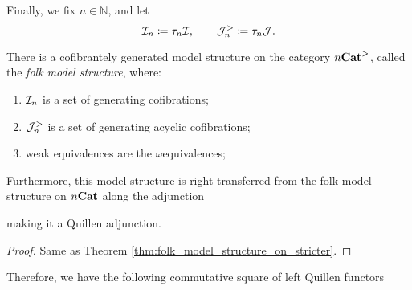 \noindent Finally, we fix \( n \in \mathbb{N} \), and let
\begin{equation*}
    \mathcal{I}_n \coloneqq \tau_{n}\mathcal{I},\quad\quad \mathcal{J}^>_n \coloneqq \tau_{n}\mathcal{J}.
\end{equation*}

\begin{thm} \label{thm:folk_model_structure_on_stricter_n}
    There is a cofibrantely generated model structure on the category \( {n\mathbf{Cat}}^> \), called the \emph{folk model structure}, where:
    \begin{enumerate}
        \item \( \mathcal{I}_n \) is a set of generating cofibrations;
        \item \( \mathcal{J}^>_n \) is a set of generating acyclic cofibrations;
        \item weak equivalences are the \( \omega \)\nbd equivalences;
    \end{enumerate}
    Furthermore, this model structure is right transferred from the folk model structure on \( {n\mathbf{Cat}} \) along the adjunction 
    \begin{center}
    \end{center}
    making it a Quillen adjunction.
\end{thm}
\begin{proof}
    Same as Theorem \ref{thm:folk_model_structure_on_stricter}.
\end{proof}

Therefore, we have the following commutative square of left Quillen functors
\begin{center}
\end{center}